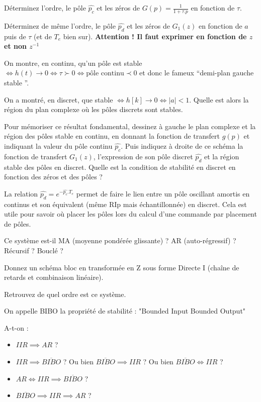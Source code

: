 

Déterminez l'ordre, le pôle $\widehat{p_c}$ et les zéros de
$G(p)=\frac{1}{1+\tau.p}$ en fonction de $\tau$. 


Déterminez de même l'ordre, le pôle $\widehat{p_d}$ et les zéros de $G_1(z)$
en fonction de $a$ puis de $\tau$ (et de $T_e$ bien
sur). \textbf{Attention ! Il faut exprimer en fonction de $z$ et non
  $z^{-1}$}

On montre, en continu, qu'un pôle est stable $\iff h(t) \to 0 \iff \tau\succ 0 \iff \text{pôle continu} \prec 0$ et donc le fameux ``demi-plan gauche stable ''.

On a montré, en discret, que stable $\iff h[k] \to 0 \iff |a|<1$. Quelle est alors la région du plan complexe où les pôles discrets sont stables. 

Pour mémoriser ce résultat fondamental, dessinez à gauche le plan
complexe et la région des pôles stable en continu, en donnant la
fonction de transfert $g(p)$ et indiquant la valeur du pôle continu
$\widehat{p_c}$.  Puis indiquez à droite de ce schéma la fonction de transfert
$G_1(z)$, l'expression de son pôle discret $\widehat{p_d}$ et la région stable
des pôles en discret.  Quelle est la condition de stabilité en discret
en fonction des zéros et des pôles ?

\begin{remarque}
La relation $\widehat{p_d} = e^{-\widehat{p_c}.T_e}$ permet de faire le lien entre un
pôle oscillant amortis en continus et son équivalent (même RIp mais
échantillonnée) en discret. Cela est utile pour savoir où placer les
pôles lors du calcul d'une commande par placement de pôles.
\end{remarque}
Ce système est-il MA (moyenne pondérée glissante) ? AR (auto-régressif) ? Récursif ? Bouclé ?


Donnez un schéma bloc en transformée en Z sous forme Directe I (chaîne de retards et combinaison linéaire). 

Retrouvez de quel ordre est ce système.

On appelle BIBO la propriété de stabilité : "Bounded Input Bounded Output"

A-t-on :  
\begin{itemize}
\item $IIR \implies AR$ ?
\item $IIR \implies \overline{BIBO}$ ? Ou bien $ \overline{BIBO} \implies IIR$ ? Ou bien $\overline{BIBO} \iff IIR$ ?
\item $AR \iff IIR \implies \overline{BIBO}$ ?
\item $\overline{BIBO} \implies IIR \implies AR$ ?
\end{itemize}
